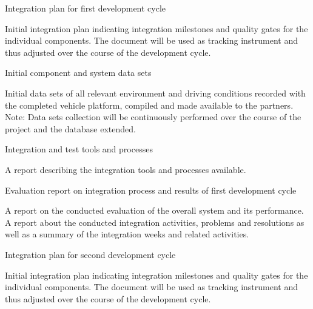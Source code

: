 {\begin{deliverables}{\WPIntegrationNo}
%


\item Integration plan for first development cycle
  \label{del:wpintegration:intplan1}
\delresponsible{\VW}

Initial integration plan indicating integration milestones and quality gates for the individual components. The document will be used as tracking instrument and thus adjusted over the course of the development cycle.

\item Initial component and system data sets
  \label{del:wpintegration:dataset}
\delresponsible{\VW}

Initial data sets of all relevant environment and driving conditions recorded with the completed vehicle platform, compiled and made available to the partners.
Note: Data sets collection will be continuously performed over the course of the project and the database extended.

\item Integration and test tools and processes 
  \label{del:wpintegration:inttools}
\delresponsible{\VW}

A report describing the integration tools and processes available.

\item Evaluation report on integration process and results of first development cycle 
  \label{del:wpintegration:eval1}
\delresponsible{\VW}

A report on the conducted evaluation of the overall system and its performance.
A report about the conducted integration activities, problems and resolutions as well as a summary of the integration weeks and related activities.

\item Integration plan for second development cycle
  \label{del:wpintegration:intplan2}
\delresponsible{\VW}

Initial integration plan indicating integration milestones and quality gates for the individual components. The document will be used as tracking instrument and thus adjusted over the course of the development cycle.


\end{deliverables}}
